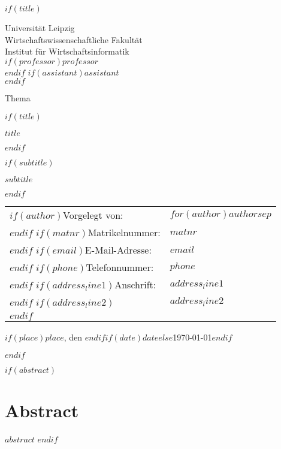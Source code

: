 \documentclass[12pt, a4paper, oneside, titlepage]{book}
\newcommand{\placeanddate}{$if(place)$$place$, den $endif$$if(date)$$date$$else$\today$endif$}
\begin{document}
$if(title)$
\begin{titlepage}
  \noindent
  Universität Leipzig\\
  Wirtschaftswissenschaftliche Fakultät\\
  Institut für Wirtschaftsinformatik\\
  $if(professor)$$professor$\\$endif$
  $if(assistant)$$assistant$\\$endif$
  
  \vfill
  

    \centering
    Thema\\
  {\selectfont %
    $if(title)$
      {\Large\bfseries $title$ \par}
      \vspace{1cm}
    $endif$
  } %
    $if(subtitle)$
      {\large $subtitle$ \par}
      \vspace{1.5cm}
    $endif$


  \vfill
  \raggedright

  \begin{flushleft}
    \begin{tabular}{@{}ll}\\
      $if(author)$Vorgelegt von: & \quad $for(author)$$author$$sep$ \and $endfor$\\$endif$
      $if(matnr)$Matrikelnummer: & \quad $matnr$\\$endif$
      $if(email)$E-Mail-Adresse: & \quad $email$\\$endif$
      $if(phone)$Telefonnummer: & \quad $phone$\\$endif$
      $if(address_line1)$Anschrift: & \quad $address_line1$ \\$endif$
      $if(address_line2)$& \quad $address_line2$ \\$endif$
    \end{tabular}
  \end{flushleft}

  \vspace{0.5cm}

  \placeanddate\par
\end{titlepage}
$endif$

$if(abstract)$
  \chapter*{Abstract}
  \thispagestyle{plain}
  $abstract$
  \clearpage
  \pagestyle{fancy}
$endif$
\end{document}
